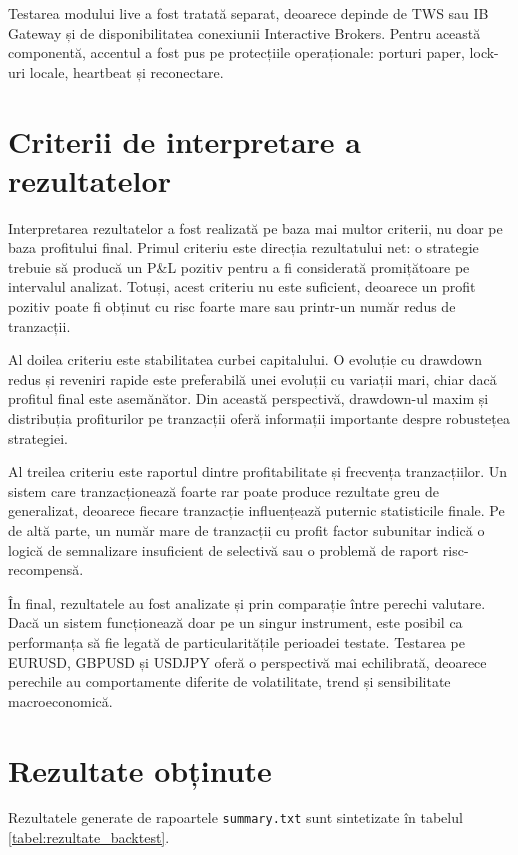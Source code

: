 Testarea modului live a fost tratată separat, deoarece depinde de TWS sau IB Gateway și de disponibilitatea conexiunii Interactive Brokers. Pentru această componentă, accentul a fost pus pe protecțiile operaționale: porturi paper, lock-uri locale, heartbeat și reconectare.

\section{Criterii de interpretare a rezultatelor}
\label{cap:cap4:criterii_interpretare}

Interpretarea rezultatelor a fost realizată pe baza mai multor criterii, nu doar pe baza profitului final. Primul criteriu este direcția rezultatului net: o strategie trebuie să producă un P\&L pozitiv pentru a fi considerată promițătoare pe intervalul analizat. Totuși, acest criteriu nu este suficient, deoarece un profit pozitiv poate fi obținut cu risc foarte mare sau printr-un număr redus de tranzacții.

Al doilea criteriu este stabilitatea curbei capitalului. O evoluție cu drawdown redus și reveniri rapide este preferabilă unei evoluții cu variații mari, chiar dacă profitul final este asemănător. Din această perspectivă, drawdown-ul maxim și distribuția profiturilor pe tranzacții oferă informații importante despre robustețea strategiei.

Al treilea criteriu este raportul dintre profitabilitate și frecvența tranzacțiilor. Un sistem care tranzacționează foarte rar poate produce rezultate greu de generalizat, deoarece fiecare tranzacție influențează puternic statisticile finale. Pe de altă parte, un număr mare de tranzacții cu profit factor subunitar indică o logică de semnalizare insuficient de selectivă sau o problemă de raport risc-recompensă.

În final, rezultatele au fost analizate și prin comparație între perechi valutare. Dacă un sistem funcționează doar pe un singur instrument, este posibil ca performanța să fie legată de particularitățile perioadei testate. Testarea pe EURUSD, GBPUSD și USDJPY oferă o perspectivă mai echilibrată, deoarece perechile au comportamente diferite de volatilitate, trend și sensibilitate macroeconomică.

\section{Rezultate obținute}
\label{cap:cap4:rezultate}

Rezultatele generate de rapoartele \texttt{summary.txt} sunt sintetizate în tabelul \ref{tabel:rezultate_backtest}.

